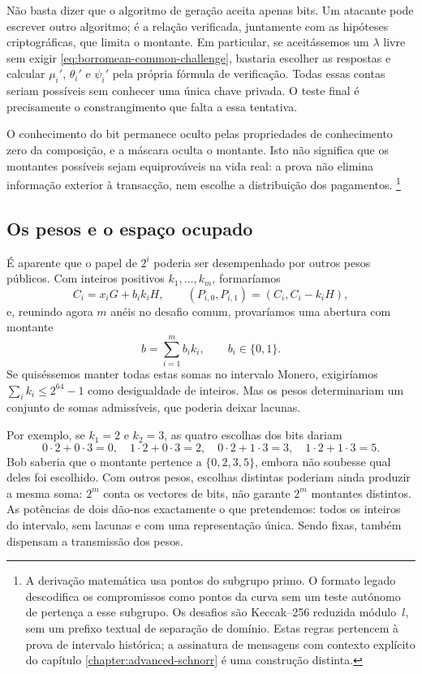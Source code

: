 Não basta dizer que o algoritmo de geração aceita apenas bits. Um atacante
pode escrever outro algoritmo; é a relação verificada, juntamente com as
hipóteses criptográficas, que limita o montante. Em particular, se aceitássemos
um \(\lambda\) livre sem exigir
\eqref{eq:borromean-common-challenge}, bastaria escolher as respostas e
calcular \(\mu_i'\), \(\theta_i'\) e \(\psi_i'\) pela própria fórmula de
verificação. Todas essas contas seriam possíveis sem conhecer uma única chave
privada. O teste final é precisamente o constrangimento que falta a essa
tentativa.

O conhecimento do bit permanece oculto pelas propriedades de conhecimento
zero da composição, e a máscara oculta o montante. Isto não significa que os
montantes possíveis sejam equiprováveis na vida real: a prova não elimina
informação exterior à transacção, nem escolhe a distribuição dos pagamentos.
\footnote{A derivação matemática usa pontos do subgrupo primo. O formato
legado descodifica os compromissos como pontos da curva sem um teste autónomo
de pertença a esse subgrupo. Os desafios são Keccak--256 reduzida módulo~\(l\),
sem um prefixo textual de separação de domínio. Estas regras pertencem à prova
de intervalo histórica; a assinatura de mensagens com contexto explícito do
capítulo \ref{chapter:advanced-schnorr} é uma construção distinta.}

\subsection{Os pesos e o espaço ocupado}

É aparente que o papel de \(2^i\) poderia ser desempenhado por outros pesos
públicos. Com inteiros positivos \(k_1,\ldots,k_m\), formaríamos
\[
 C_i=x_iG+b_ik_iH,\qquad
 (P_{i,0},P_{i,1})=(C_i,C_i-k_iH),
\]
e, reunindo agora \(m\) anéis no desafio comum, provaríamos uma abertura com
montante
\[
 b=\sum_{i=1}^{m}b_ik_i,\qquad b_i\in\{0,1\}.
\]
Se quiséssemos manter todas estas somas no intervalo Monero, exigiríamos
\(\sum_i k_i\leq2^{64}-1\) como desigualdade de inteiros. Mas os pesos
determinariam um conjunto de somas admissíveis, que poderia deixar lacunas.

Por exemplo, se \(k_1=2\) e \(k_2=3\), as quatro escolhas dos bits dariam
\[
 0\cdot2+0\cdot3=0,\quad
 1\cdot2+0\cdot3=2,\quad
 0\cdot2+1\cdot3=3,\quad
 1\cdot2+1\cdot3=5.
\]
Bob saberia que o montante pertence a \(\{0,2,3,5\}\), embora não soubesse
qual deles foi escolhido. Com outros pesos, escolhas distintas poderiam
ainda produzir a mesma soma: \(2^m\) conta os vectores de bits, não garante
\(2^m\) montantes distintos. As potências de dois dão-nos exactamente o que
pretendemos: todos os inteiros do intervalo, sem lacunas e com uma
representação única. Sendo fixas, também dispensam a transmissão dos pesos.

